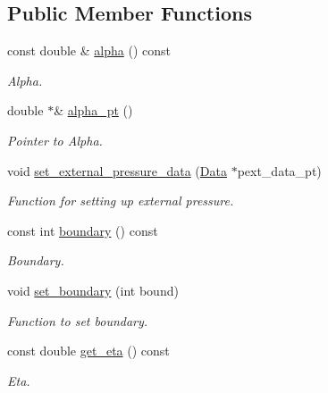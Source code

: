 \subsection*{Public Member Functions}
\begin{DoxyCompactItemize}
\item 
const double \& \hyperlink{classoomph_1_1PolarNavierStokesTractionElement_af67d69b32f607b34b642f26b663a0777}{alpha} () const
\begin{DoxyCompactList}\small\item\em Alpha. \end{DoxyCompactList}\item 
double $\ast$\& \hyperlink{classoomph_1_1PolarNavierStokesTractionElement_ab9bd68ca6e8e237a3e95862baaac2450}{alpha\+\_\+pt} ()
\begin{DoxyCompactList}\small\item\em Pointer to Alpha. \end{DoxyCompactList}\item 
void \hyperlink{classoomph_1_1PolarNavierStokesTractionElement_ac1b44b5788d5f5f54905a011744f6511}{set\+\_\+external\+\_\+pressure\+\_\+data} (\hyperlink{classoomph_1_1Data}{Data} $\ast$pext\+\_\+data\+\_\+pt)
\begin{DoxyCompactList}\small\item\em Function for setting up external pressure. \end{DoxyCompactList}\item 
const int \hyperlink{classoomph_1_1PolarNavierStokesTractionElement_a07805e640ad3179ad30d53e2210fa98e}{boundary} () const
\begin{DoxyCompactList}\small\item\em Boundary. \end{DoxyCompactList}\item 
void \hyperlink{classoomph_1_1PolarNavierStokesTractionElement_ad014869b40a523b9fe81d8a816e069e2}{set\+\_\+boundary} (int bound)
\begin{DoxyCompactList}\small\item\em Function to set boundary. \end{DoxyCompactList}\item 
const double \hyperlink{classoomph_1_1PolarNavierStokesTractionElement_a9314ca8da5a3a8fcfff1bb14ce4963d5}{get\+\_\+eta} () const
\begin{DoxyCompactList}\small\item\em Eta. \end{DoxyCompactList}\item 

\end{DoxyCompactItemize}
